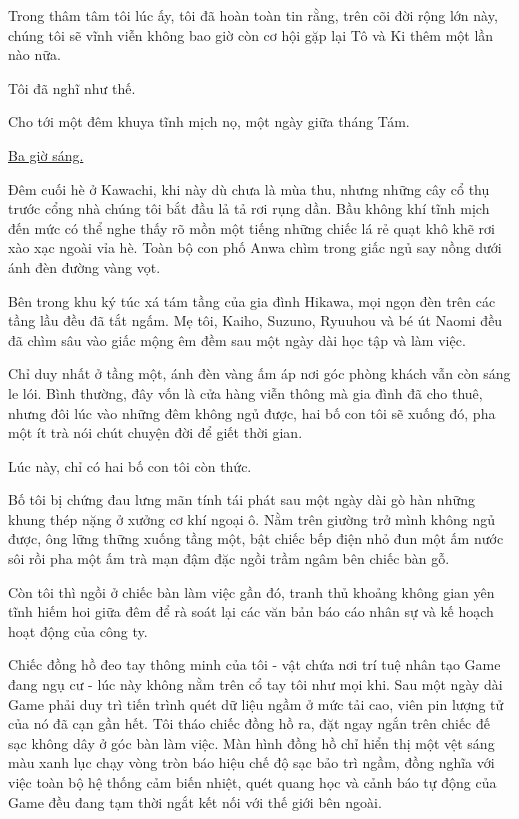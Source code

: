 \documentclass[../main.tex]{subfiles}
\begin{document}
Trong thâm tâm tôi lúc ấy, tôi đã hoàn toàn tin rằng, trên cõi đời rộng lớn này, chúng tôi sẽ vĩnh viễn không bao giờ còn cơ hội gặp lại Tô và Ki thêm một lần nào nữa.

Tôi đã nghĩ như thế.

Cho tới một đêm khuya tĩnh mịch nọ, một ngày giữa tháng Tám.

\begin{center}
  \uline{Ba giờ sáng.}
\end{center}

Đêm cuối hè ở Kawachi, khi này dù chưa là mùa thu, nhưng những cây cổ thụ trước cổng nhà chúng tôi bắt đầu lả tả rơi rụng dần. Bầu không khí tĩnh mịch đến mức có thể nghe thấy rõ mồn một tiếng những chiếc lá rẻ quạt khô khẽ rơi xào xạc ngoài vỉa hè. Toàn bộ con phố Anwa chìm trong giấc ngủ say nồng dưới ánh đèn đường vàng vọt.

Bên trong khu ký túc xá tám tầng của gia đình Hikawa, mọi ngọn đèn trên các tầng lầu đều đã tắt ngấm. Mẹ tôi, Kaiho, Suzuno, Ryuuhou và bé út Naomi đều đã chìm sâu vào giấc mộng êm đềm sau một ngày dài học tập và làm việc.

Chỉ duy nhất ở tầng một, ánh đèn vàng ấm áp nơi góc phòng khách vẫn còn sáng le lói. Bình thường, đây vốn là cửa hàng viễn thông mà gia đình đã cho thuê, nhưng đôi lúc vào những đêm không ngủ được, hai bố con tôi sẽ xuống đó, pha một ít trà nói chút chuyện đời để giết thời gian.

Lúc này, chỉ có hai bố con tôi còn thức.

Bố tôi bị chứng đau lưng mãn tính tái phát sau một ngày dài gò hàn những khung thép nặng ở xưởng cơ khí ngoại ô. Nằm trên giường trở mình không ngủ được, ông lững thững xuống tầng một, bật chiếc bếp điện nhỏ đun một ấm nước sôi rồi pha một ấm trà mạn đậm đặc ngồi trầm ngâm bên chiếc bàn gỗ.

Còn tôi thì ngồi ở chiếc bàn làm việc gần đó, tranh thủ khoảng không gian yên tĩnh hiếm hoi giữa đêm để rà soát lại các văn bản báo cáo nhân sự và kế hoạch hoạt động của công ty.

Chiếc đồng hồ đeo tay thông minh của tôi - vật chứa nơi trí tuệ nhân tạo Game đang ngụ cư - lúc này không nằm trên cổ tay tôi như mọi khi. Sau một ngày dài Game phải duy trì tiến trình quét dữ liệu ngầm ở mức tải cao, viên pin lượng tử của nó đã cạn gần hết. Tôi tháo chiếc đồng hồ ra, đặt ngay ngắn trên chiếc đế sạc không dây ở góc bàn làm việc. Màn hình đồng hồ chỉ hiển thị một vệt sáng màu xanh lục chạy vòng tròn báo hiệu chế độ sạc bảo trì ngầm, đồng nghĩa với việc toàn bộ hệ thống cảm biến nhiệt, quét quang học và cảnh báo tự động của Game đều đang tạm thời ngắt kết nối với thế giới bên ngoài.
\end{document}

